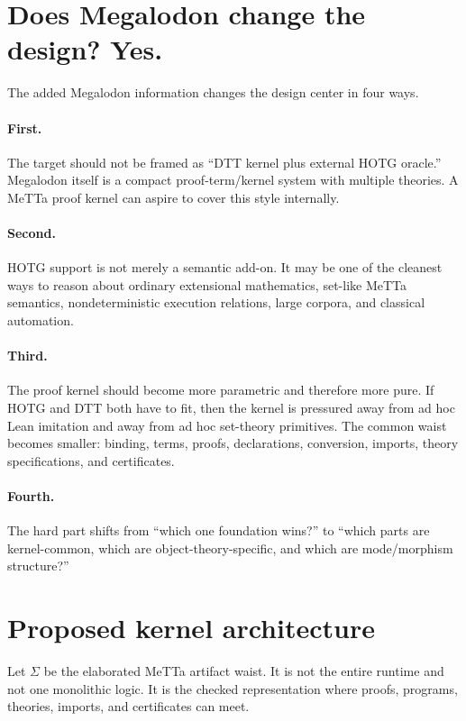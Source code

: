 \documentclass[11pt]{article}
\newcommand{\MeTTa}{\textup{MeTTa}}
\newcommand{\Megalodon}{\textup{Megalodon}}
\newcommand{\HOTG}{\textup{HOTG}}
\newcommand{\DTT}{\textup{DTT}}
\begin{document}
\section{Does Megalodon change the design? Yes.}

The added Megalodon information changes the design center in four ways.

\paragraph{First.} The target should not be framed as ``DTT kernel plus external HOTG oracle.''  \Megalodon{} itself is a compact proof-term/kernel system with multiple theories.  A \MeTTa{} proof kernel can aspire to cover this style internally.

\paragraph{Second.} \HOTG{} support is not merely a semantic add-on.  It may be one of the cleanest ways to reason about ordinary extensional mathematics, set-like MeTTa semantics, nondeterministic execution relations, large corpora, and classical automation.

\paragraph{Third.} The proof kernel should become more parametric and therefore more pure.  If \HOTG{} and \DTT{} both have to fit, then the kernel is pressured away from ad hoc Lean imitation and away from ad hoc set-theory primitives.  The common waist becomes smaller: binding, terms, proofs, declarations, conversion, imports, theory specifications, and certificates.

\paragraph{Fourth.} The hard part shifts from ``which one foundation wins?'' to ``which parts are kernel-common, which are object-theory-specific, and which are mode/morphism structure?''

\section{Proposed kernel architecture}

Let \(\Sigma\) be the elaborated \MeTTa{} artifact waist.  It is not the entire runtime and not one monolithic logic.  It is the checked representation where proofs, programs, theories, imports, and certificates can meet.
\end{document}

